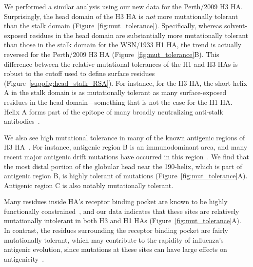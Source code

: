 \documentclass[9pt,twocolumn,twoside]{pnas-new}
\begin{document}
We performed a similar analysis using our new data for the Perth/2009 H3 HA.
Surprisingly, the head domain of the H3 HA is \emph{not} more mutationally tolerant than the stalk domain (Figure~\ref{fig:mut_tolerance}).
Specifically, whereas solvent-exposed residues in the head domain are substantially more mutationally tolerant than those in the stalk domain for the WSN/1933 H1 HA, the trend is actually reversed for the Perth/2009 H3 HA (Figure~\ref{fig:mut_tolerance}B).
This difference between the relative mutational tolerances of the H1 and H3 HAs is robust to the cutoff used to define surface residues (Figure~\ref{suppfig:head_stalk_RSA}).
For instance, for the H3 HA, the short helix A in the stalk domain is as mutationally tolerant as many surface-exposed residues in the head domain---something that is not the case for the H1 HA.
Helix A forms part of the epitope of many broadly neutralizing anti-stalk antibodies~\cite{mallajosyula2014influenza,laursen2013broadly,chai2016two}.

We also see high mutational tolerance in many of the known antigenic regions of H3 HA~\cite{wiley1981structural}.
For instance, antigenic region B is an immunodominant area, and many recent major antigenic drift mutations have occurred in this region~\cite{chambers2015identification,koel2013substitutions,popova2012immunodominance}.
We find that the most distal portion of the globular head near the 190-helix, which is part of antigenic region B, is highly tolerant of mutations (Figure~\ref{fig:mut_tolerance}A).
Antigenic region C is also notably mutationally tolerant.

Many residues inside HA's receptor binding pocket are known to be highly functionally constrained~\cite{wilson1981structure,martin1998studies}, and our data indicates that these sites are relatively mutationally intolerant in both H3 and H1 HAs (Figure~\ref{fig:mut_tolerance}A).
In contrast, the residues surrounding the receptor binding pocket are fairly mutationally tolerant, which may contribute to the rapidity of influenza's antigenic evolution, since mutations at these sites can have large effects on antigenicity~\cite{wiley1981structural,koel2013substitutions}.
\end{document}
